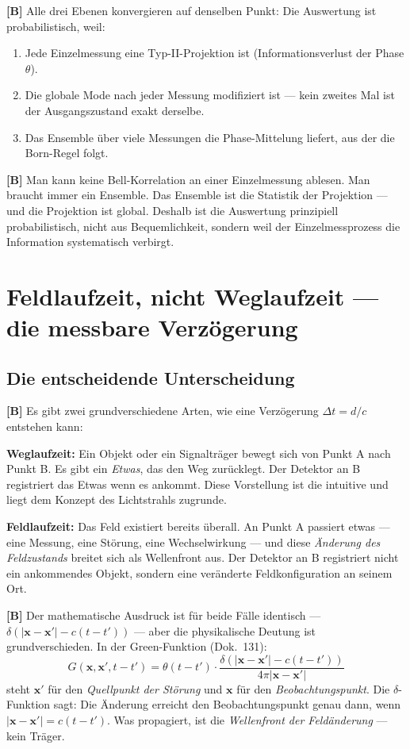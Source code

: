 \textbf{[B]} Alle drei Ebenen konvergieren auf denselben Punkt:
Die Auswertung ist probabilistisch, weil:

\begin{enumerate}[leftmargin=1.6em,itemsep=0.3em]
  \item Jede Einzelmessung eine Typ-II-Projektion ist (Informationsverlust
    der Phase $\theta$).
  \item Die globale Mode nach jeder Messung modifiziert ist ---
    kein zweites Mal ist der Ausgangszustand exakt derselbe.
  \item Das Ensemble über viele Messungen die Phase-Mittelung liefert,
    aus der die Born-Regel folgt.
\end{enumerate}

\textbf{[B]} Man kann keine Bell-Korrelation an einer Einzelmessung
ablesen. Man braucht immer ein Ensemble. Das Ensemble ist die Statistik
der Projektion --- und die Projektion ist global. Deshalb ist die
Auswertung prinzipiell probabilistisch, nicht aus Bequemlichkeit,
sondern weil der Einzelmessprozess die Information systematisch verbirgt.

\section{Feldlaufzeit, nicht Weglaufzeit --- die messbare Verzögerung}

\subsection{Die entscheidende Unterscheidung}

\textbf{[B]} Es gibt zwei grundverschiedene Arten, wie eine Verzögerung
$\Delta t = d/c$ entstehen kann:

\textbf{Weglaufzeit:} Ein Objekt oder ein Signalträger bewegt sich von
Punkt A nach Punkt B. Es gibt ein \emph{Etwas}, das den Weg zurücklegt.
Der Detektor an B registriert das Etwas wenn es ankommt. Diese
Vorstellung ist die intuitive und liegt dem Konzept des Lichtstrahls
zugrunde.

\textbf{Feldlaufzeit:} Das Feld existiert bereits überall. An Punkt A
passiert etwas --- eine Messung, eine Störung, eine Wechselwirkung ---
und diese \emph{Änderung des Feldzustands} breitet sich als Wellenfront
aus. Der Detektor an B registriert nicht ein ankommendes Objekt,
sondern eine veränderte Feldkonfiguration an seinem Ort.

\textbf{[B]} Der mathematische Ausdruck ist für beide Fälle identisch
--- $\delta(|\mathbf{x}-\mathbf{x}'| - c(t-t'))$ --- aber die
physikalische Deutung ist grundverschieden. In der Green-Funktion
(Dok.~131):
\[
  G(\mathbf{x},\mathbf{x}',t-t')
  = \theta(t-t') \cdot \frac{\delta(|\mathbf{x}-\mathbf{x}'| - c(t-t'))}{4\pi|\mathbf{x}-\mathbf{x}'|}
\]
steht $\mathbf{x}'$ für den \emph{Quellpunkt der Störung} und
$\mathbf{x}$ für den \emph{Beobachtungspunkt}. Die $\delta$-Funktion
sagt: Die Änderung erreicht den Beobachtungspunkt genau dann, wenn
$|\mathbf{x}-\mathbf{x}'| = c(t-t')$. Was propagiert, ist die
\emph{Wellenfront der Feldänderung} --- kein Träger.

